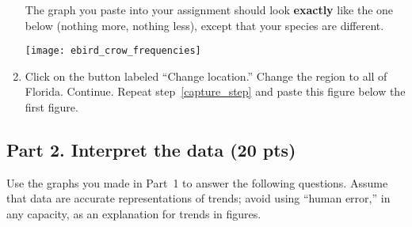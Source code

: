 \documentclass[12pt]{article}
\begin{document}
\begin{enumerate}
The graph you paste into your assignment should look \textbf{{exactly}}
like the one below (nothing more, nothing less), except that your
species are different.

\texttt{[image: ebird\_crow\_frequencies]}




\item Click on the button labeled ``Change location.'' Change the region to all of Florida. 
Continue. Repeat step~\ref{capture_step} and paste this figure below the first figure.

\end{enumerate}

\subsection*{Part 2. Interpret the data (20 pts)}

Use the graphs you made in Part~1 to answer the following questions.
Assume that data are accurate representations of trends; avoid using
“human error,” in any capacity, as an explanation for trends in
figures.
\end{document}
